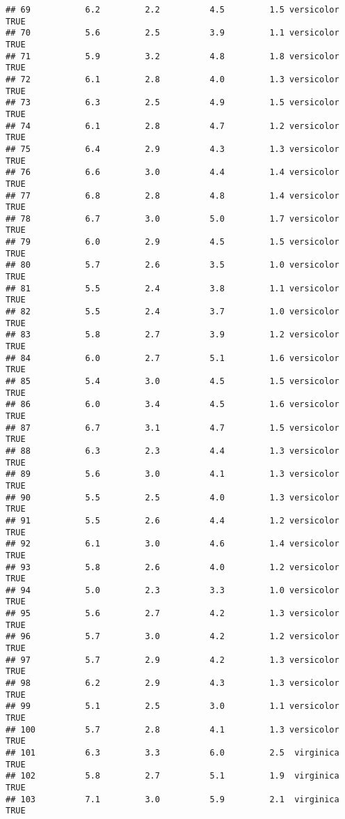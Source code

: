 \documentclass[]{article}
\begin{document}
\begin{verbatim}
## 69           6.2         2.2          4.5         1.5 versicolor   TRUE
## 70           5.6         2.5          3.9         1.1 versicolor   TRUE
## 71           5.9         3.2          4.8         1.8 versicolor   TRUE
## 72           6.1         2.8          4.0         1.3 versicolor   TRUE
## 73           6.3         2.5          4.9         1.5 versicolor   TRUE
## 74           6.1         2.8          4.7         1.2 versicolor   TRUE
## 75           6.4         2.9          4.3         1.3 versicolor   TRUE
## 76           6.6         3.0          4.4         1.4 versicolor   TRUE
## 77           6.8         2.8          4.8         1.4 versicolor   TRUE
## 78           6.7         3.0          5.0         1.7 versicolor   TRUE
## 79           6.0         2.9          4.5         1.5 versicolor   TRUE
## 80           5.7         2.6          3.5         1.0 versicolor   TRUE
## 81           5.5         2.4          3.8         1.1 versicolor   TRUE
## 82           5.5         2.4          3.7         1.0 versicolor   TRUE
## 83           5.8         2.7          3.9         1.2 versicolor   TRUE
## 84           6.0         2.7          5.1         1.6 versicolor   TRUE
## 85           5.4         3.0          4.5         1.5 versicolor   TRUE
## 86           6.0         3.4          4.5         1.6 versicolor   TRUE
## 87           6.7         3.1          4.7         1.5 versicolor   TRUE
## 88           6.3         2.3          4.4         1.3 versicolor   TRUE
## 89           5.6         3.0          4.1         1.3 versicolor   TRUE
## 90           5.5         2.5          4.0         1.3 versicolor   TRUE
## 91           5.5         2.6          4.4         1.2 versicolor   TRUE
## 92           6.1         3.0          4.6         1.4 versicolor   TRUE
## 93           5.8         2.6          4.0         1.2 versicolor   TRUE
## 94           5.0         2.3          3.3         1.0 versicolor   TRUE
## 95           5.6         2.7          4.2         1.3 versicolor   TRUE
## 96           5.7         3.0          4.2         1.2 versicolor   TRUE
## 97           5.7         2.9          4.2         1.3 versicolor   TRUE
## 98           6.2         2.9          4.3         1.3 versicolor   TRUE
## 99           5.1         2.5          3.0         1.1 versicolor   TRUE
## 100          5.7         2.8          4.1         1.3 versicolor   TRUE
## 101          6.3         3.3          6.0         2.5  virginica   TRUE
## 102          5.8         2.7          5.1         1.9  virginica   TRUE
## 103          7.1         3.0          5.9         2.1  virginica   TRUE

\end{verbatim}
\end{document}

